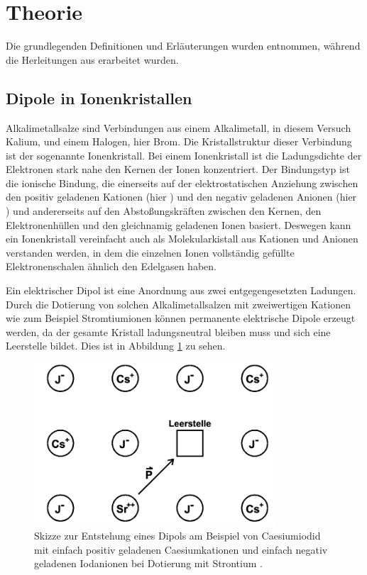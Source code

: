 \section{Theorie}
\label{sec:Theorie}

Die grundlegenden Definitionen und Erläuterungen wurden \cite{AshcroftMermin} entnommen, während die Herleitungen aus \cite{xxx} erarbeitet wurden.

\subsection{Dipole in Ionenkristallen}

Alkalimetallsalze sind Verbindungen aus einem Alkalimetall, in diesem Versuch Kalium, und einem Halogen, hier Brom. Die Kristallstruktur dieser Verbindung ist der sogenannte Ionenkristall. Bei einem Ionenkristall ist die Ladungsdichte der Elektronen stark nahe den Kernen der Ionen konzentriert. Der Bindungstyp ist die ionische Bindung, die einerseits auf der elektrostatischen Anziehung zwischen den positiv geladenen Kationen (hier ) und den negativ geladenen Anionen (hier ) und andererseits auf den Abstoßungskräften zwischen den Kernen, den Elektronenhüllen und den gleichnamig geladenen Ionen basiert.
Deswegen kann ein Ionenkristall vereinfacht auch als Molekularkistall aus Kationen und Anionen verstanden werden, in dem die einzelnen Ionen vollständig gefüllte Elektronenschalen ähnlich den Edelgasen haben.

Ein elektrischer Dipol ist eine Anordnung aus zwei entgegengesetzten Ladungen.
Durch die Dotierung von solchen Alkalimetallsalzen mit zweiwertigen Kationen wie zum Beispiel Stromtiumionen  können permanente elektrische Dipole erzeugt werden, da der gesamte Kristall ladungsneutral bleiben muss und sich eine Leerstelle bildet. Dies ist in Abbildung \ref{fig:dipolIonenkristall} zu sehen.

\begin{figure}
  \centering
  \includegraphics[width=0.8\textwidth]{data/kristall.png}
  \caption{Skizze zur Entstehung eines Dipols am Beispiel von Caesiumiodid mit einfach positiv geladenen Caesiumkationen und einfach negativ geladenen Iodanionen bei Dotierung mit Strontium \cite{anleitungalt}.}
  \label{fig:dipolIonenkristall}
\end{figure}

